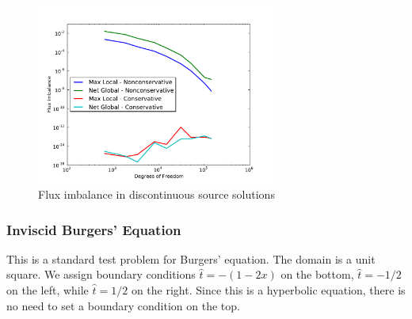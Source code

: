 \documentclass[letterpaper]{article}
\begin{document}
\begin{figure}[p]
\centering
\includegraphics[width=0.7\textwidth]{figs/Discontinuous/modifiedFlux.pdf}
\caption{Flux imbalance in discontinuous source solutions}
\label{fig:discontinuous_flux}
\end{figure}

\subsubsection{Inviscid Burgers' Equation}\label{sec:inviscidBurgers}
This is a standard test problem for Burgers' equation. The domain is a unit
square. We assign boundary conditions $\hat t=-(1-2x)$ on the bottom, $\hat
t=-1/2$ on the left, while $\hat t=1/2$ on the right. Since this is a
hyperbolic equation, there is no need to set a boundary condition on the top.
\end{document}
